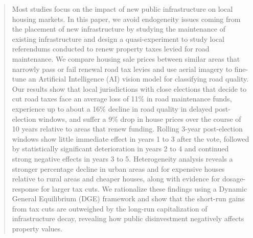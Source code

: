 \documentclass[12pt]{article}
\begin{document}
\begin{titlepage}
\begin{abstract}
\noindent Most studies focus on the impact of new public infrastructure on local housing markets. In this paper, we avoid endogeneity issues coming from the placement of new infrastructure by studying the maintenance of existing infrastructure and design a quasi-experiment to study local referendums conducted to renew property taxes levied for road maintenance. We compare housing sale prices between similar areas that narrowly pass or fail renewal road tax levies and use aerial imagery to fine-tune an Artificial Intelligence (AI) vision model for classifying road quality. Our results show that local jurisdictions with close elections that decide to cut road taxes face an average loss of 11\% in road maintenance funds, experience up to about a 16\% decline in road quality in delayed post-election windows, and suffer a 9\% drop in house prices over the course of 10 years relative to areas that renew funding. Rolling 3-year post-election windows show little immediate effect in years 1 to 3 after the vote, followed by statistically significant deterioration in years 2 to 4 and continued strong negative effects in years 3 to 5. Heterogeneity analysis reveals a stronger percentage decline in urban areas and for expensive houses relative to rural areas and cheaper houses, along with evidence for dosage-response for larger tax cuts. We rationalize these findings using a Dynamic General Equilibrium (DGE) framework and show that the short-run gains from tax cuts are outweighed by the long-run capitalization of infrastructure decay, revealing how public disinvestment negatively affects property values.  

\end{abstract}
\end{titlepage}
\end{document}
